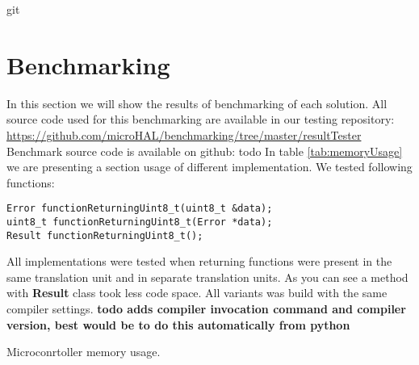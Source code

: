 git \documentclass{article}
\let\Oldsection\section
\renewcommand{\section}{\FloatBarrier\Oldsection}
\begin{document}
\section{Benchmarking}
In this section we will show the results of benchmarking of each solution.\newline
All source code used for this benchmarking are available in our testing repository: \url{https://github.com/microHAL/benchmarking/tree/master/resultTester}
Benchmark source code is available on github: todo\newline
In table \ref{tab:memoryUsage} we are presenting a section usage of different implementation. We tested following functions:
\begin{lstlisting}
Error functionReturningUint8_t(uint8_t &data);
uint8_t functionReturningUint8_t(Error *data);
Result functionReturningUint8_t();
\end{lstlisting}

All implementations were tested when returning functions were present in the same translation unit and in separate translation units. As you can see a method with \textbf{Result} class took less code space. All variants was build with the same compiler settings.\newline\newline
\textbf{todo adds compiler invocation command and compiler version, best would be to do this automatically from python}
\newline\newline



\begin{table}[!h]
\centering
\caption{Microconrtoller memory usage.\label{tab:memoryUsage}}
\loadedtable
\pgfplotstabletypeset[
	set thousands separator={\,},
	col sep=&,
	row sep=\\,
	columns={implementation,translation unit,bss,data,text,dec},
	column type/.add={|}{},%
	assign column name/.style={/pgfplots/table/column name={\textbf{#1}}},			
	every head row/.style={before row={
		\hline		
		\multicolumn{2}{|c|}{\textbf{Test configuration}} & \multicolumn{4}{c|}{\textbf{Section size}}\\
		\hline
		},
		after row=\hline
	},
	every last row/.style={after row=\hline},
	every last column/.style={column type/.add={}{|}},
	columns/implementation/.style={
		string type,
		assign cell content/.code={
			\ifnum\pgfplotstablerow=0
				\pgfkeyssetvalue{/pgfplots/table/@cell content}{\multirow{2}{*}{##1}}%
			\fi		
			\ifnum\pgfplotstablerow=2
				\pgfkeyssetvalue{/pgfplots/table/@cell content}{\multirow{2}{*}{##1}}%
			\fi	
			\ifnum\pgfplotstablerow=4
				\pgfkeyssetvalue{/pgfplots/table/@cell content}{\multirow{2}{*}{##1}}%
			\fi	
		},
	},
	columns/translation unit/.style={string type},
	every even row/.style={before row={\hline}},%
]\loadedtable
\end{table}
\end{document}
